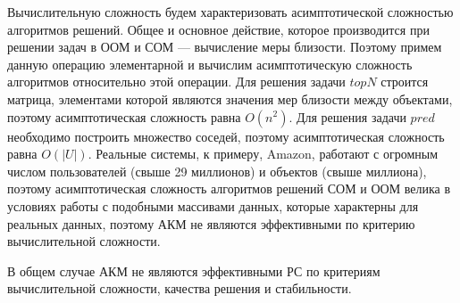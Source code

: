 Вычислительную сложность будем характеризовать асимптотической сложностью
алгоритмов решений. Общее и основное действие, которое производится при
решении задач в ООМ и СОМ
--- вычисление меры близости. Поэтому примем данную операцию элементарной
и вычислим асимптотическую сложность алгоритмов относительно этой операции.
Для решения задачи $topN$ строится матрица, элементами которой являются
значения мер близости между объектами, поэтому
асимптотическая сложность равна $O(n^2)$.
Для решения задачи $pred$ необходимо построить множество соседей,
поэтому асимптотическая сложность равна $O(|U|)$.
Реальные системы, к примеру, Amazon, работают с огромным числом пользователей
(свыше 29 миллионов) и объектов (свыше миллиона), поэтому
асимптотическая сложность алгоритмов решений СОМ и ООМ велика в условиях работы
с подобными массивами данных, которые характерны для реальных данных, поэтому
АКМ не являются эффективными по критерию вычислительной сложности.

В общем случае АКМ не являются эффективными РС по критериям вычислительной
сложности, качества решения и стабильности.
